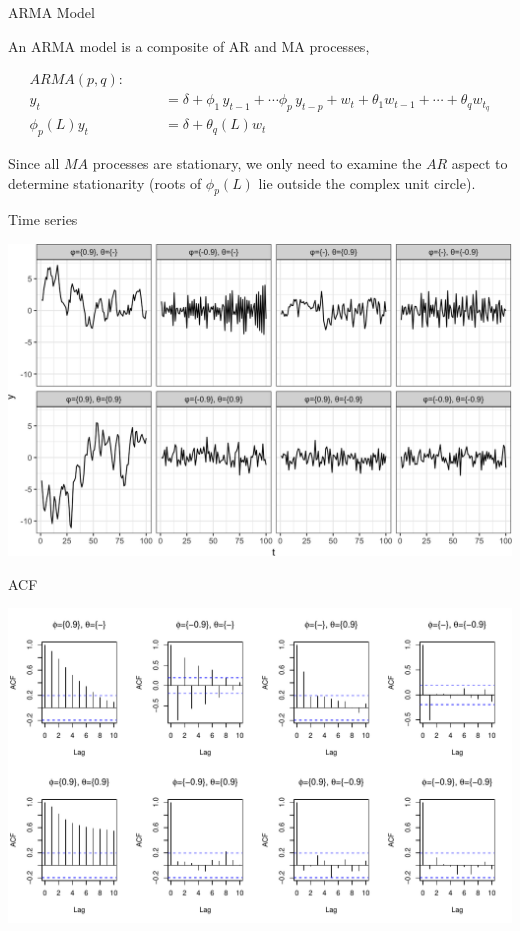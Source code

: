 \documentclass[11pt,ignorenonframetext,]{beamer}
\begin{document}
\begin{frame}[t]{ARMA Model}

An ARMA model is a composite of AR and MA processes,

\[
\begin{aligned}
ARMA(p,q): \quad\quad\\
   y_t &= \delta + \phi_1 \, y_{t-1} + \cdots \phi_p \, y_{t-p} + w_{t} + \theta_1 w_{t-1} + \cdots + \theta_q w_{t_q} \\
  \phi_p(L) y_t &= \delta + \theta_q(L)w_t 
\end{aligned}
\]

Since all \(MA\) processes are stationary, we only need to examine the
\(AR\) aspect to determine stationarity (roots of \(\phi_p(L)\) lie
outside the complex unit circle).

\end{frame}

\begin{frame}{Time series}

\includegraphics[width=1.2\textwidth]{Lec8_files/figure-beamer/unnamed-chunk-5-1}

\end{frame}

\begin{frame}{ACF}

\includegraphics[width=1.2\textwidth]{Lec8_files/figure-beamer/unnamed-chunk-6-1}

\end{frame}
\end{document}
